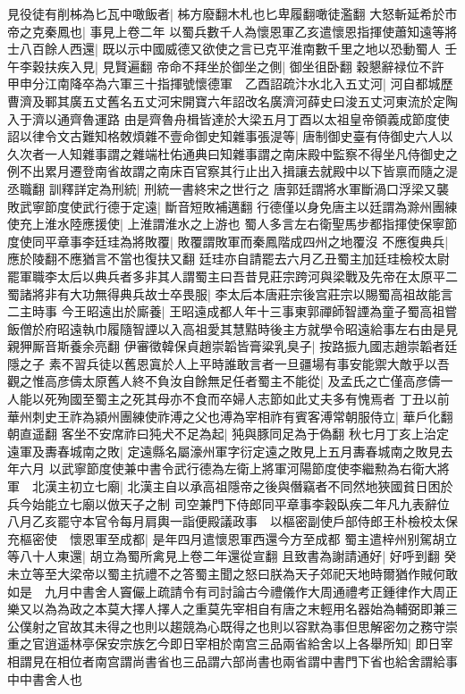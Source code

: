 見役徒有削柹為匕瓦中噉飯者|{
	柹方廢翻木札也匕卑履翻噉徒濫翻}
大怒斬延希於市　帝之克秦鳳也|{
	事見上卷二年}
以蜀兵數千人為懷恩軍乙亥遣懷恩指揮使蕭知遠等將士八百餘人西還|{
	既以示中國威德又欲使之言已克平淮南數千里之地以恐動蜀人}
壬午李穀扶疾入見|{
	見賢遍翻}
帝命不拜坐於御坐之側|{
	御坐徂卧翻}
穀懇辭禄位不許　甲申分江南降卒為六軍三十指揮號懷德軍　乙酉詔疏汴水北入五丈河|{
	河自都城歷曹濟及鄆其廣五丈舊名五丈河宋開寶六年詔改名廣濟河薛史曰浚五丈河東流於定陶入于濟以通齊魯運路}
由是齊魯舟楫皆達於大梁五月丁酉以太祖皇帝領義成節度使　詔以律令文古難知格敇煩雜不壹命御史知雜事張湜等|{
	唐制御史臺有侍御史六人以久次者一人知雜事謂之雜端杜佑通典曰知雜事謂之南床殿中監察不得坐凡侍御史之例不出累月遷登南省故謂之南床百官察其行止出入揖讓去就殿中以下皆禀而隨之湜丞職翻}
訓釋詳定為刑統|{
	刑統一書終宋之世行之}
唐郭廷謂將水軍斷渦口浮梁又襲敗武寧節度使武行德于定遠|{
	斷音短敗補邁翻}
行德僅以身免唐主以廷謂為滁州團練使充上淮水陸應援使|{
	上淮謂淮水之上游也}
蜀人多言左右衛聖馬步都指揮使保寧節度使同平章事李廷珪為將敗覆|{
	敗覆謂敗軍而秦鳳階成四州之地覆沒}
不應復典兵|{
	應於陵翻不應猶言不當也復扶又翻}
廷珪亦自請罷去六月乙丑蜀主加廷珪檢校太尉罷軍職李太后以典兵者多非其人謂蜀主曰吾昔見莊宗跨河與梁戰及先帝在太原平二蜀諸將非有大功無得典兵故士卒畏服|{
	李太后本唐莊宗後宫莊宗以賜蜀高祖故能言二主時事}
今王昭遠出於廝養|{
	王昭遠成都人年十三事東郭禪師智諲為童子蜀高祖嘗飯僧於府昭遠執巾履隨智諲以入高祖愛其慧黠時後主方就學令昭遠給事左右由是見親狎厮音斯養余亮翻}
伊審徵韓保貞趙崇韜皆膏粱乳臭子|{
	按路振九國志趙崇韜者廷隱之子}
素不習兵徒以舊恩寘於人上平時誰敢言者一旦疆場有事安能禦大敵乎以吾觀之惟高彦儔太原舊人終不負汝自餘無足任者蜀主不能從|{
	及孟氏之亡僅高彦儔一人能以死殉國至蜀主之死其母亦不食而卒婦人志節如此丈夫多有愧焉者}
丁丑以前華州刺史王祚為潁州團練使祚溥之父也溥為宰相祚有賓客溥常朝服侍立|{
	華戶化翻朝直遥翻}
客坐不安席祚曰㹠犬不足為起|{
	㹠與豚同足為于偽翻}
秋七月丁亥上治定遠軍及夀春城南之敗|{
	定遠縣名屬濠州軍字衍定遠之敗見上五月夀春城南之敗見去年六月}
以武寧節度使兼中書令武行德為左衛上將軍河陽節度使李繼勲為右衛大將軍　北漢主初立七廟|{
	北漢主自以承高祖隱帝之後與僭竊者不同然地狹國貧日困於兵今始能立七廟以倣天子之制}
司空兼門下侍郎同平章事李穀臥疾二年凡九表辭位八月乙亥罷守本官令每月肩輿一詣便殿議政事　以樞密副使戶部侍郎王朴檢校太保充樞密使　懷恩軍至成都|{
	是年四月遣懷恩軍西還今方至成都}
蜀主遣梓州别駕胡立等八十人東還|{
	胡立為蜀所禽見上卷二年還從宣翻}
且致書為謝請通好|{
	好呼到翻}
癸未立等至大梁帝以蜀主抗禮不之答蜀主聞之怒曰朕為天子郊祀天地時爾猶作賊何敢如是　九月中書舍人竇儼上疏請令有司討論古今禮儀作大周通禮考正鍾律作大周正樂又以為為政之本莫大擇人擇人之重莫先宰相自有唐之末輕用名器始為輔弼即兼三公僕射之官故其未得之也則以趨競為心既得之也則以容默為事但思解密勿之務守崇重之官逍遥林亭保安宗族乞今即日宰相於南宫三品兩省給舍以上各舉所知|{
	即日宰相謂見在相位者南宫謂尚書省也三品謂六部尚書也兩省謂中書門下省也給舍謂給事中中書舍人也}
